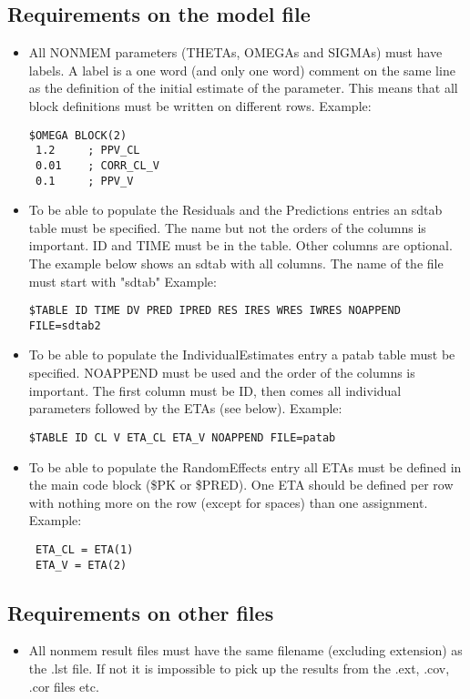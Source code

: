 \subsection{Requirements on the model file}
\begin{itemize}
    \item All NONMEM parameters (THETAs, OMEGAs and SIGMAs) must have labels. A label is a one word (and only one word) comment on the same line as the definition of the initial estimate of the parameter. This means that all block definitions must be written on different rows. Example:
        \begin{verbatim}
$OMEGA BLOCK(2)
 1.2     ; PPV_CL
 0.01    ; CORR_CL_V
 0.1     ; PPV_V
        \end{verbatim}
    \item To be able to populate the Residuals and the Predictions entries an sdtab table must be specified. The name but not the orders of the columns is important. ID and TIME must be in the table. Other columns are optional. The example below shows an sdtab with all columns. The name of the file must start with "sdtab" Example:
        \begin{verbatim}
$TABLE ID TIME DV PRED IPRED RES IRES WRES IWRES NOAPPEND FILE=sdtab2
        \end{verbatim}
    \item To be able to populate the IndividualEstimates entry a patab table must be specified. NOAPPEND must be used and the order of the columns is important. The first column must be ID, then comes all individual parameters followed by the ETAs (see below). Example:
        \begin{verbatim}
$TABLE ID CL V ETA_CL ETA_V NOAPPEND FILE=patab
        \end{verbatim}
    \item To be able to populate the RandomEffects entry all ETAs must be defined in the main code block (\$PK or \$PRED). One ETA should be defined per row with nothing more on the row (except for spaces) than one assignment. Example:
        \begin{verbatim}
 ETA_CL = ETA(1)
 ETA_V = ETA(2)
        \end{verbatim}
\end{itemize}


\subsection{Requirements on other files}
\begin{itemize}
    \item All nonmem result files must have the same filename (excluding extension) as the .lst file. If not it is impossible to pick up the results from the .ext, .cov, .cor files etc.
\end{itemize}



